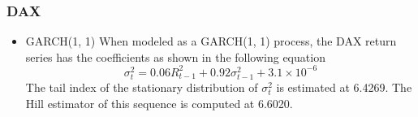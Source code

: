 \documentclass[aoas,preprint]{imsart}
\numberwithin{equation}{section}
\theoremstyle{plain}
\begin{document}
\subsubsection{DAX}
\begin{itemize}
\item GARCH(1, 1)
  When modeled as a GARCH(1, 1) process, the DAX return series
  has the coefficients as shown in the following equation
  \[
  \sigma_t^2 = 0.06 R_{t-1}^2 + 0.92 \sigma_{t-1}^2 + 3.1 \times 10^{-6}
  \]
  The tail index of the stationary distribution of $\sigma_t^2$ is
  estimated at 6.4269. The Hill estimator of this
  sequence is computed at 6.6020.


\end{itemize}
\end{document}
